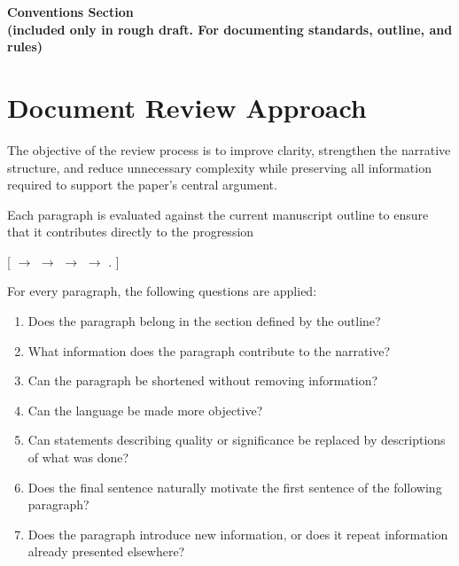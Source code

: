 
\newpage
\clearpage
\begin{center}
\Large\textbf{Conventions Section\\ (included only in rough draft. For documenting standards, outline, and rules)}
\end{center}

\section*{Document Review Approach}

The objective of the review process is to improve clarity, strengthen
the narrative structure, and reduce unnecessary complexity while
preserving all information required to support the paper's central
argument.

Each paragraph is evaluated against the current manuscript outline to
ensure that it contributes directly to the progression

[
$\rightarrow$
$\rightarrow$
$\rightarrow$
$\rightarrow$
.
]

For every paragraph, the following questions are applied:

\begin{enumerate}

\item Does the paragraph belong in the section defined by the outline?

\item What information does the paragraph contribute to the narrative?

\item Can the paragraph be shortened without removing information?

\item Can the language be made more objective?

\item Can statements describing quality or significance be replaced by
descriptions of what was done?

\item Does the final sentence naturally motivate the first sentence of
the following paragraph?

\item Does the paragraph introduce new information, or does it repeat
information already presented elsewhere?

\end{enumerate}

